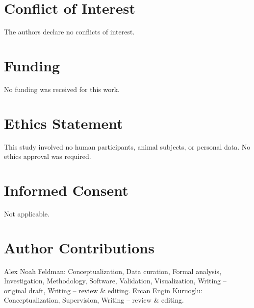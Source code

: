\documentclass[12pt]{article}
\begin{document}
\section*{Conflict of Interest}

The authors declare no conflicts of interest.

\section*{Funding}

No funding was received for this work.

\section*{Ethics Statement}

This study involved no human participants, animal subjects, or personal
data. No ethics approval was required.

\section*{Informed Consent}

Not applicable.

\section*{Author Contributions}

Alex Noah Feldman: Conceptualization, Data curation, Formal analysis,
Investigation, Methodology, Software, Validation, Visualization,
Writing -- original draft, Writing -- review \& editing.
Ercan Engin Kuruoglu: Conceptualization, Supervision, Writing --
review \& editing.



\end{document}
